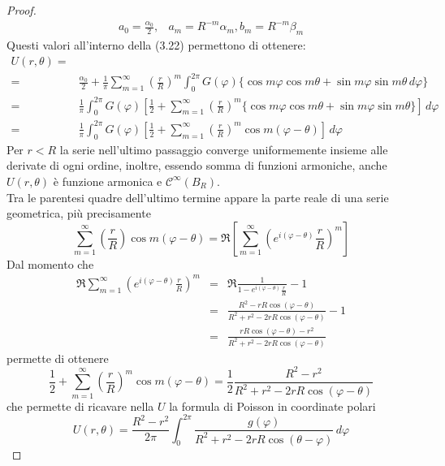 \documentclass[a4paper,12pt, draft]{article}
\theoremstyle{break}
\let\phi\varphi
\numberwithin{equation}{section}
\begin{document}
\begin{proof}
\[  \begin{array}{ccc}
    a_0 = \frac{\alpha_0}{2}, & a_m = R^{-m}\alpha_m, b_m = R^{-m} \beta_m
  \end{array}
\]
Questi valori all'interno della (3.22) permettono di ottenere:
\[
\begin{array}{cl}
  U(r, \theta) = & \\
  = & \frac{\alpha_0}{2} + \frac{1}{\pi} \sum_{m=1}^{\infty} (\frac{r}{R})^m \int_0^{2\pi} G(\phi) \{\cos{m\phi}\cos{m\theta} + \sin{m \phi} \sin{m\theta} \, d\phi\} \\
  = & \frac{1}{\pi} \int_0^{2\pi} G(\phi) \left[\frac{1}{2} + \sum_{m=1}^{\infty} \left(\frac{r}{R}\right)^m \{\cos{m\phi} \cos{m\theta} + \sin{m\phi} \sin{m\theta}\}\right] \, d\phi \\
  = & \frac{1}{\pi} \int_0^{2\pi} G(\phi) \left[\frac{1}{2}+ \sum_{m=1}^{\infty} \left(\frac{r}{R}\right)^m \cos{m(\phi - \theta)}\right] \, d\phi
\end{array}
\]
Per \(r < R\) la serie nell'ultimo passaggio converge uniformemente insieme alle derivate di ogni ordine, inoltre, essendo somma di funzioni armoniche, anche \(U(r, \theta)\) è funzione armonica e \(\mathcal{C}^{\infty}(B_R)\). \\
Tra le parentesi quadre dell'ultimo termine appare la parte reale di una serie geometrica, più precisamente
\[
  \sum_{m=1}^{\infty} \left(\frac{r}{R}\right) \cos{m(\phi - \theta)} = \Re\left[\sum_{m=1}^{\infty}\left(e^{i(\phi -\theta)}\frac{r}{R}\right)^m\right]
\]
Dal momento che 
\[
\begin{array}{lcl}
  \Re\sum_{m=1}^{\infty} \left(e^{i(\phi - \theta)}\frac{r}{R}\right)^m & = & \Re\frac{1}{1-e^{i(\phi - \theta)}\frac{r}{R}} - 1 \\
  & = & \frac{R^2 - rR\cos{(\phi - \theta)}}{R^2 + r^2 - 2rR\cos{(\phi -\theta)}} - 1 \\
  & = & \frac{rR\cos{(\phi -\theta)}-r^2}{R^2 +r^2 - 2rR\cos{(\phi - \theta)}}
\end{array}  
\]
permette di ottenere 
\begin{equation}
  \frac{1}{2} + \sum_{m=1}^{\infty} \left(\frac{r}{R}\right)^m \cos{m(\phi - \theta)} = \frac{1}{2}\frac{R^2 - r^2}{R^2 + r^2 - 2rR\cos{(\phi - \theta)}}
\end{equation}
che permette di ricavare nella \(U\) la formula di Poisson in coordinate polari
\begin{equation}
  U(r, \theta) = \frac{R^2 - r^2}{2\pi}\int_0^{2\pi} \frac{g(\phi)}{R^2 + r^2 - 2rR \cos{(\theta - \phi)}} \, d\phi

\end{equation}
\end{proof}
\end{document}
